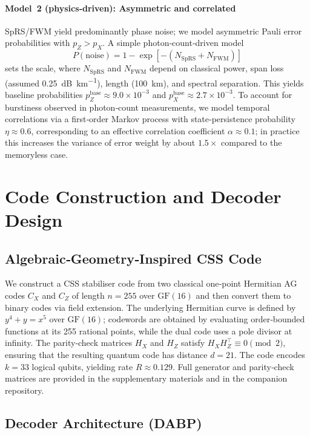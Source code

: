 \documentclass[conference]{IEEEtran}
\begin{document}
\paragraph*{Model 2 (physics‑driven): Asymmetric and correlated}  SpRS/FWM yield predominantly phase noise; we model asymmetric Pauli error probabilities with $p_Z>p_X$.  A simple photon‑count‑driven model
\begin{equation}
P(\text{noise})=1-\exp[-(N_{\mathrm{SpRS}}+N_{\mathrm{FWM}})]
\end{equation}
sets the scale, where $N_{\mathrm{SpRS}}$ and $N_{\mathrm{FWM}}$ depend on classical power, span loss (assumed \SI{0.25}{\dB\per\kilo\meter}), length (\SI{100}{\kilo\meter}), and spectral separation.  This yields baseline probabilities $p_Z^{\mathrm{base}}\approx 9.0\times 10^{-3}$ and $p_X^{\mathrm{base}}\approx 2.7\times 10^{-3}$.  To account for burstiness observed in photon‑count measurements, we model temporal correlations via a first‑order Markov process with state‑persistence probability $\eta\approx 0.6$, corresponding to an effective correlation coefficient $\alpha\approx 0.1$; in practice this increases the variance of error weight by about $1.5\times$ compared to the memoryless case.

\section{Code Construction and Decoder Design}

\subsection{Algebraic‑Geometry‑Inspired CSS Code}
We construct a CSS stabiliser code from two classical one‑point Hermitian AG codes $C_X$ and $C_Z$ of length $n=255$ over $\mathrm{GF}(16)$ and then convert them to binary codes via field extension.  The underlying Hermitian curve is defined by $y^4+y = x^5$ over $\mathrm{GF}(16)$; codewords are obtained by evaluating order‑bounded functions at its 255 rational points, while the dual code uses a pole divisor at infinity.  The parity‑check matrices $H_X$ and $H_Z$ satisfy $H_X H_Z^\top \equiv 0 \pmod{2}$, ensuring that the resulting quantum code has distance $d=21$.  The code encodes $k=33$ logical qubits, yielding rate $R\approx 0.129$.  Full generator and parity‑check matrices are provided in the supplementary materials and in the companion repository.

\subsection{Decoder Architecture (DABP)}
\end{document}

